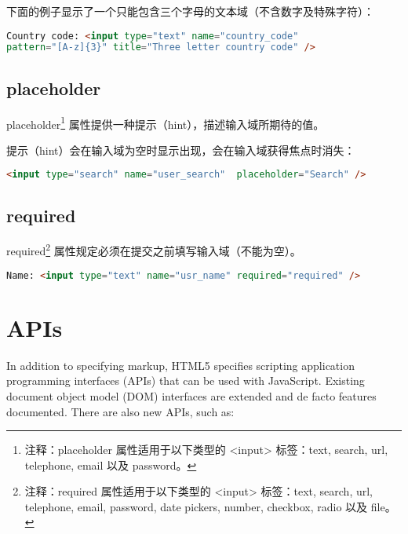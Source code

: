 下面的例子显示了一个只能包含三个字母的文本域（不含数字及特殊字符）：

\begin{lstlisting}[language=HTML]
Country code: <input type="text" name="country_code"
pattern="[A-z]{3}" title="Three letter country code" />
\end{lstlisting}



\subsection{placeholder}

placeholder\footnote{注释：placeholder 属性适用于以下类型的 <input> 标签：text, search, url, telephone, email 以及 password。} 属性提供一种提示（hint），描述输入域所期待的值。

提示（hint）会在输入域为空时显示出现，会在输入域获得焦点时消失：

\begin{lstlisting}[language=HTML]
<input type="search" name="user_search"  placeholder="Search" />
\end{lstlisting}


\subsection{required}

required\footnote{注释：required 属性适用于以下类型的 <input> 标签：text, search, url, telephone, email, password, date pickers, number, checkbox, radio 以及 file。} 属性规定必须在提交之前填写输入域（不能为空）。


\begin{lstlisting}[language=HTML]
Name: <input type="text" name="usr_name" required="required" />
\end{lstlisting}




\section{APIs}


In addition to specifying markup, HTML5 specifies scripting application programming interfaces (APIs) that can be used with JavaScript. Existing document object model (DOM) interfaces are extended and de facto features documented. There are also new APIs, such as:

